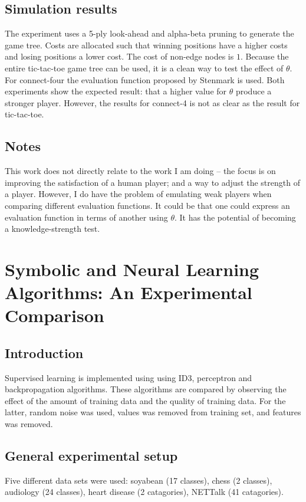 \subsection{Simulation results}  The experiment uses a 5-ply look-ahead and alpha-beta pruning to generate the game tree.  Costs are allocated such that winning positions have a higher costs and losing positions a lower cost. The cost of non-edge nodes is $1$.  Because the entire tic-tac-toe game tree can be used, it is a clean way to test the effect of $\theta$.  For connect-four the evaluation function proposed by Stenmark \cite{stenmark:masters} is used.  Both experiments show the expected result: that a higher value for $\theta$ produce a stronger player.  However, the results for connect-4 is not as clear as the result for tic-tac-toe.
\subsection{Notes} This work does not directly relate to the work I am doing -- the focus is on improving the satisfaction of a human player; and a way to adjust the strength of a player.  However, I do have the problem of emulating weak players when comparing different evaluation functions.  It could be that one could express an evaluation function in terms of another using $\theta$.  It has the potential of becoming a knowledge-strength test. 

\section{Symbolic and Neural Learning Algorithms: An Experimental Comparison}
\cite{shavlik:comparision}
\subsection{Introduction}
Supervised learning is implemented using using ID3, perceptron and backpropagation algorithms.  These algorithms are compared by observing the effect of the amount of training data and the quality of training data.  For the latter, random noise was used, values was removed from training set, and features was removed.
\subsection{General experimental setup}
Five different data sets were used: soyabean (17 classes), chess (2 classes), audiology (24 classes), heart disease (2 catagories), NETTalk (41 catagories). 

